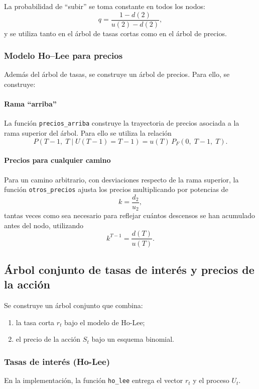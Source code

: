 \documentclass[12pt, a4paper]{article}
\begin{document}
La probabilidad de “subir” se toma constante en todos los nodos:
$$
q=\frac{1-d(2)}{u(2)-d(2)},
$$
y se utiliza tanto en el árbol de tasas cortas como en el árbol de precios.

\subsubsection{Modelo Ho–Lee para precios}

Además del árbol de tasas, se construye un árbol de precios. Para ello, se construye:

\paragraph{Rama ``arriba''}
La función \texttt{precios\_arriba} construye la trayectoria de precios asociada a la rama superior del árbol. 
Para ello se utiliza la relación
\[
P(T-1,\;T \mid U(T-1)=T-1)=u(T)\,P_F(0,\;T-1,\;T).
\]

\paragraph{Precios para cualquier camino}
Para un camino arbitrario, con desviaciones respecto de la rama superior, la función \texttt{otros\_precios} ajusta los precios multiplicando por potencias de
\[
k=\frac{d_2}{u_2},
\]
tantas veces como sea necesario para reflejar cuántos descensos se han acumulado antes del nodo, utilizando
\[
k^{T-1}=\frac{d(T)}{u(T)}.
\]

\subsection{Árbol conjunto de tasas de interés y precios de la acción}

Se construye un árbol conjunto que combina:
\begin{enumerate}
  \item la tasa corta $r_t$ bajo el modelo de Ho-Lee;
  \item el precio de la acción $S_t$ bajo un esquema binomial.
\end{enumerate}

\subsubsection*{Tasas de interés (Ho-Lee)}

En la implementación, la función \texttt{ho\_lee} entrega el vector $r_t$ y el proceso $U_t$.  
\end{document}

